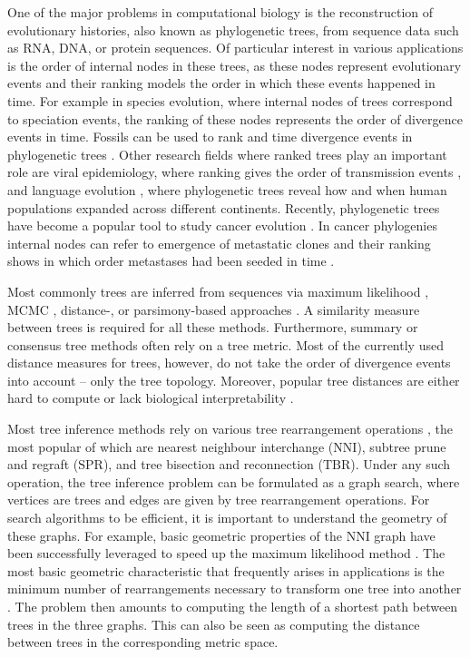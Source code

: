 \documentclass[11pt]{amsart}
\newcommand{\nni}{\mathrm{NNI}}
\newcommand{\spr}{\mathrm{SPR}}
\newcommand{\tbr}{\mathrm{TBR}}
\begin{document}
One of the major problems in computational biology is the reconstruction of evolutionary histories, also known as phylogenetic trees, from sequence data such as RNA, DNA, or protein sequences.
Of particular interest in various applications is the order of internal nodes in these trees, as these nodes represent evolutionary events and their ranking models the order in which these events happened in time.
For example in species evolution, where internal nodes of trees correspond to speciation events, the ranking of these nodes represents the order of divergence events in time.
Fossils can be used to rank and time divergence events in phylogenetic trees \autocite{Gavryushkina2014-xd}.
Other research fields where ranked trees play an important role are viral epidemiology, where ranking gives the order of transmission events \autocite{Ypma2013-zm}, and language evolution \autocite{Bouckaert2018-sf, Gray2009-jy}, where phylogenetic trees reveal how and when human populations expanded across different continents.
Recently, phylogenetic trees have become a popular tool to study cancer evolution \autocite{Singer2018-rr, alves2019rapid}.
In cancer phylogenies internal nodes can refer to emergence of metastatic clones and their ranking shows in which order metastases had been seeded in time \autocite{Lote2017-hg}.

Most commonly trees are inferred from sequences via maximum likelihood \autocite{Stamatakis2006-xb, Guindon2010-lo}, MCMC \autocite{Ronquist2003-eq, Suchard2018-tw, Bouckaert2019-yr}, distance-, or parsimony-based approaches \autocite{Tamura2011-ky}.
A similarity measure between trees is required for all these methods.
Furthermore, summary or consensus tree methods \autocite{McMorris1994-no, Bansal2010-vr, Whidden2014-sx} often rely on a tree metric.
Most of the currently used distance measures for trees, however, do not take the order of divergence events into account -- only the tree topology.
Moreover, popular tree distances are either hard to compute or lack biological interpretability \autocite{Whidden2018-fw}.

Most tree inference methods rely on various tree rearrangement operations \autocite{Semple2003-nj}, the most popular of which are nearest neighbour interchange ($\nni$), subtree prune and regraft ($\spr$), and tree bisection and reconnection ($\tbr$).
Under any such operation, the tree inference problem can be formulated as a graph search, where vertices are trees and edges are given by tree rearrangement operations.
For search algorithms to be efficient, it is important to understand the geometry of these graphs.
For example, basic geometric properties of the $\nni$ graph have been successfully leveraged to speed up the maximum likelihood method \autocite{Nguyen2015-sp}.
The most basic geometric characteristic that frequently arises in applications is the minimum number of rearrangements necessary to transform one tree into another \autocite{Semple2003-nj}.
The problem then amounts to computing the length of a shortest path between trees in the three graphs.
This can also be seen as computing the distance between trees in the corresponding metric space.
\end{document}
